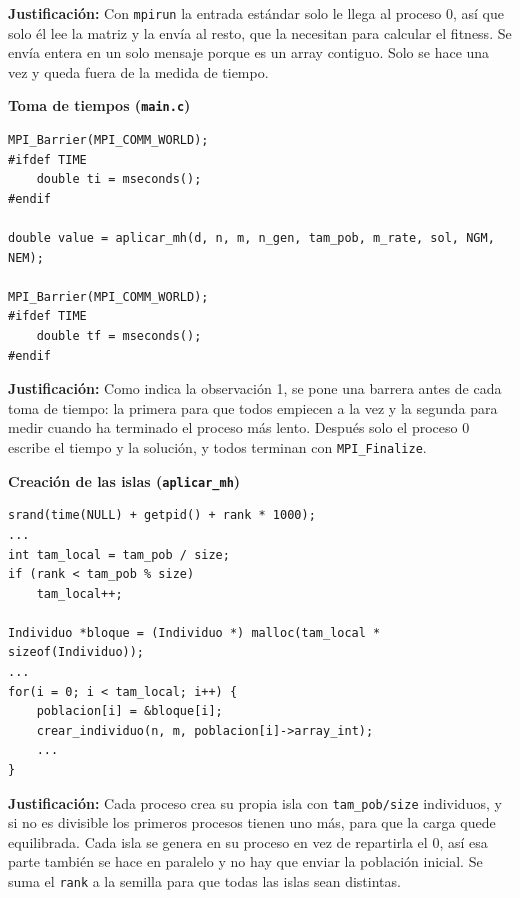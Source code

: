 \documentclass[12pt]{article}
\begin{document}
\begin{enumerate}
\textbf{Justificación:} Con \texttt{mpirun} la entrada estándar solo le llega al proceso 0, así que solo él lee la matriz y la envía al resto, que la necesitan para calcular el fitness. Se envía entera en un solo mensaje porque es un array contiguo. Solo se hace una vez y queda fuera de la medida de tiempo.

\vspace{0.5cm}


\medskip
\noindent\textbf{Toma de tiempos (\texttt{main.c})}\par
\smallskip

\begin{lstlisting}[style=EstiloC]
MPI_Barrier(MPI_COMM_WORLD);
#ifdef TIME
	double ti = mseconds();
#endif

double value = aplicar_mh(d, n, m, n_gen, tam_pob, m_rate, sol, NGM, NEM);

MPI_Barrier(MPI_COMM_WORLD);
#ifdef TIME
	double tf = mseconds();
#endif
\end{lstlisting}

\textbf{Justificación:} Como indica la observación 1, se pone una barrera antes de cada toma de tiempo: la primera para que todos empiecen a la vez y la segunda para medir cuando ha terminado el proceso más lento. Después solo el proceso 0 escribe el tiempo y la solución, y todos terminan con \texttt{MPI\_Finalize}.

\vspace{0.5cm}


\medskip
\noindent\textbf{Creación de las islas (\texttt{aplicar\_mh})}\par
\smallskip

\begin{lstlisting}[style=EstiloC]
srand(time(NULL) + getpid() + rank * 1000);
...
int tam_local = tam_pob / size;
if (rank < tam_pob % size)
	tam_local++;

Individuo *bloque = (Individuo *) malloc(tam_local * sizeof(Individuo));
...
for(i = 0; i < tam_local; i++) {
	poblacion[i] = &bloque[i];
	crear_individuo(n, m, poblacion[i]->array_int);
	...
}
\end{lstlisting}

\textbf{Justificación:} Cada proceso crea su propia isla con \texttt{tam\_pob/size} individuos, y si no es divisible los primeros procesos tienen uno más, para que la carga quede equilibrada. Cada isla se genera en su proceso en vez de repartirla el 0, así esa parte también se hace en paralelo y no hay que enviar la población inicial. Se suma el \texttt{rank} a la semilla para que todas las islas sean distintas.


\end{enumerate}
\end{document}
